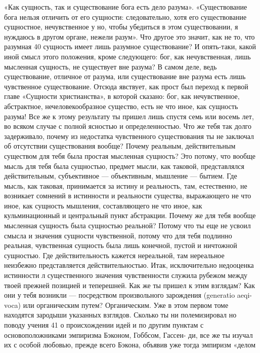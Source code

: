 \documentclass[12pt]{article}
\begin{document}
«Как сущность, так и существование бога есть дело  
разума». «Существование бога нельзя отличить от его 
сущности: следовательно, хотя его существование  
сущностное, нечувственное у но, чтобы убедиться в этом  
существовании, я нуждаюсь в другом органе, нежели  
разум». Что другое это значит, как не то, что разумная 
40 
сущность имеет лишь разумное существование? И 
опять-таки, какой иной смысл этого положения, кроме 
следующего: бог, как нечувственная, лишь мысленная 
сущность, не существует вне разума? В самом деле, 
ведь существование, отличное от разума, или  
существование вне разума есть лишь чувственное  
существование. Отсюда явствует, как прост был переход к первой 
главе «Сущности христианства», в которой сказано: бог, 
как нечувственное, абстрактное, нечеловекообразное 
существо, есть не что иное, как сущность разума! Все 
же к этому результату ты пришел лишь спустя семь 
или восемь лет, во всяком случае с полной ясностью и 
определенностью. Что же тебя так долго  
задерживало, почему из недостатка чувственного существования 
ты не заключал об отсутствии существования вообще? 
Почему реальным, действительным существом для тебя 
была простая мысленная сущность? Это потому, что  
вообще мысль для тебя была сущностью, предмет мысли, 
как таковой, представлялся действительным,  
субъективное — объективным, мышление — бытием. Где 
мысль, как таковая, принимается за истину и реальность, 
там, естественно, не возникает сомнений в истинности 
и реальности существа, выражающего не что иное, 
как сущность мышления, составляющего не что иное, как 
кульминационный и центральный пункт абстракции. 
Почему же для тебя вообще мысленная сущность была 
сущностью реальной? Потому что ты еще не усвоил 
смысла и значения сущности чувственной, потому что 
для тебя подлинно реальная, чувственная сущность 
была лишь конечной, пустой и ничтожной сущностью. 
Где действительность кажется нереальной, там  
нереальное неизбежно представляется действительностью. 
Итак, исключительно недооценка истинности л  
существенного значения чувственности служила рубежом 
между твоей прежней позицией и теперешней. Как же 
ты пришел к этим взглядам? Как они у тебя возникли — 
посредством произвольного зарождения (generatio aeqi- 
voca) или органическим путем? Органическим. Уже в 
этом первом томе находятся зародыши указанных  
взглядов. Сколько ты ни полемизировал но поводу учения 
41 
о происхождении идей и по другим пунктам с  
основоположниками эмпиризма Бэконом, Гоббсом, Гассен- 
ди, все же ты изучал их с особой любовью, прежде 
всего Бэкона, объявив уже тогда эмпиризм «делом  
\end{document}
